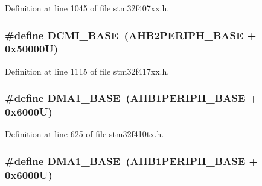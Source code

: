 Definition at line 1045 of file stm32f407xx.\+h.

\subsubsection[{\texorpdfstring{D\+C\+M\+I\+\_\+\+B\+A\+SE}{DCMI_BASE}}]{\setlength{\rightskip}{0pt plus 5cm}\#define D\+C\+M\+I\+\_\+\+B\+A\+SE~({\bf A\+H\+B2\+P\+E\+R\+I\+P\+H\+\_\+\+B\+A\+SE} + 0x50000\+U)}\hypertarget{group___peripheral__registers__structures_ga55b794507e021135486de57129a2505c}{}\label{group___peripheral__registers__structures_ga55b794507e021135486de57129a2505c}


Definition at line 1115 of file stm32f417xx.\+h.

\subsubsection[{\texorpdfstring{D\+M\+A1\+\_\+\+B\+A\+SE}{DMA1_BASE}}]{\setlength{\rightskip}{0pt plus 5cm}\#define D\+M\+A1\+\_\+\+B\+A\+SE~({\bf A\+H\+B1\+P\+E\+R\+I\+P\+H\+\_\+\+B\+A\+SE} + 0x6000\+U)}\hypertarget{group___peripheral__registers__structures_gab2d8a917a0e4ea99a22ac6ebf279bc72}{}\label{group___peripheral__registers__structures_gab2d8a917a0e4ea99a22ac6ebf279bc72}


Definition at line 625 of file stm32f410tx.\+h.

\subsubsection[{\texorpdfstring{D\+M\+A1\+\_\+\+B\+A\+SE}{DMA1_BASE}}]{\setlength{\rightskip}{0pt plus 5cm}\#define D\+M\+A1\+\_\+\+B\+A\+SE~({\bf A\+H\+B1\+P\+E\+R\+I\+P\+H\+\_\+\+B\+A\+SE} + 0x6000\+U)}\hypertarget{group___peripheral__registers__structures_gab2d8a917a0e4ea99a22ac6ebf279bc72}{}\label{group___peripheral__registers__structures_gab2d8a917a0e4ea99a22ac6ebf279bc72}


